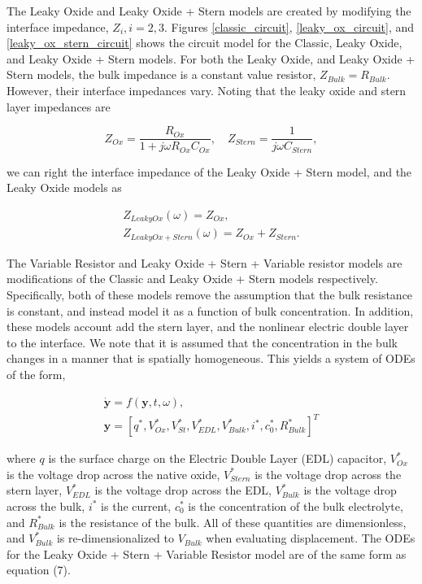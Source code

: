 The Leaky Oxide and Leaky Oxide + Stern models are created by modifying the interface impedance, $Z_i, i=2,3$. Figures \ref{classic_circuit}, \ref{leaky_ox_circuit}, and \ref{leaky_ox_stern_circuit} shows the circuit model for the Classic, Leaky Oxide, and Leaky Oxide + Stern models. For both the Leaky Oxide, and Leaky Oxide + Stern models, the bulk impedance is a constant value resistor, $Z_{Bulk}=R_{Bulk}$. However, their interface impedances vary. Noting that the leaky oxide and stern layer impedances are 

\begin{equation} \label{oxide_stern_impedances}
Z_{Ox} = \frac{R_{Ox}}{1+j\omega R_{Ox}C_{Ox}}, \quad Z_{Stern} = \frac{1}{j\omega C_{Stern}},
\end{equation}

we can right the interface impedance of the Leaky Oxide + Stern model, and the Leaky Oxide models as 

\begin{align}
Z_{LeakyOx}(\omega) = Z_{Ox}, \label{leaky_ox_imped} \\ 
Z_{LeakyOx+Stern}(\omega) = Z_{Ox}+ Z_{Stern}  \label{leaky_ox_stern_imped}. 
\end{align}

The Variable Resistor and Leaky Oxide + Stern + Variable resistor models are modifications of the Classic and Leaky Oxide + Stern models respectively. Specifically, both of these models remove the assumption that the bulk resistance is constant, and instead model it as a function of bulk concentration. In addition, these models account add the stern layer, and the nonlinear electric double layer to the interface. We note that it is assumed that the concentration in the bulk changes in a manner that is spatially homogeneous. This yields a system of ODEs of the form,

\begin{align} \label{ode_states}
\dot{\mathbf{y}} = f(\mathbf{y},t,\omega), \nonumber\\ \mathbf{y} =[q^*,V_{Ox}^*,V_{St}^*,V_{EDL}^*,V_{Bulk}^*,i^*,c_0^*,R_{Bulk}^*]^T
\end{align}

where  $q$ is the surface charge on the Electric Double Layer (EDL) capacitor, $V_{Ox}^*$  is the voltage drop across the native oxide, $V_{Stern}^*$ is the voltage drop across the stern layer, $V_{EDL}^*$ is the voltage drop across the EDL, $V_{Bulk}^*$ is the voltage drop across the bulk, $i^*$ is the current, $c_0^*$ is the concentration of the bulk electrolyte, and $R_{Bulk}^*$ is the resistance of the bulk. All of these quantities are dimensionless,  and $V_{Bulk}^*$ is re-dimensionalized to $V_{Bulk}$ when evaluating displacement. The ODEs for the Leaky Oxide + Stern + Variable Resistor model are of the same form as equation (7).

